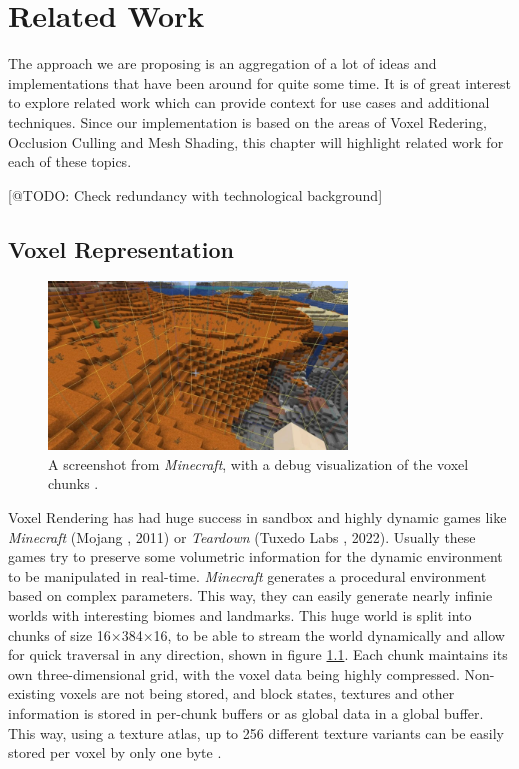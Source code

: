 \chapter{Related Work} \label{cpt-related-work}

The approach we are proposing is an aggregation of a lot of ideas and implementations that have been 
around for quite some time. It is of great interest to explore related work which can provide 
context for use cases and additional techniques. Since our implementation is based on the areas 
of Voxel Redering, Occlusion Culling and Mesh Shading, this chapter will highlight related work 
for each of these topics.

[@TODO: Check redundancy with technological background]

\section{Voxel Representation} \label{sec-voxel-representation}

\begin{figure}[h]
    \centering
    \includegraphics[width=300px]{images/graphics/minecraft-chunks.jpg}
    \caption{A screenshot from \emph{Minecraft}, with a debug visualization of the voxel chunks \cite{Palm2022}.}
    \label{fig:minecraft-chunks}
\end{figure}

\noindent
Voxel Rendering has had huge success in sandbox and highly dynamic games like \emph{Minecraft} (Mojang 
\cite{Mojang2024}, 2011) or \emph{Teardown} (Tuxedo Labs \cite{TuxedoLabs2022}, 2022). Usually these games try 
to preserve some volumetric information for the dynamic environment to be manipulated in real-time. \emph{Minecraft} 
generates a procedural environment based on complex parameters. This way, they can easily generate nearly infinie 
worlds with interesting biomes and landmarks. This huge world is split into chunks of size 16×384×16, to be able to 
stream the world dynamically and allow for quick traversal in any direction, shown in figure \ref{fig:minecraft-chunks}.
Each chunk maintains its own three-dimensional grid, with the voxel data being highly compressed. Non-existing voxels 
are not being stored, and block states, textures and other information is stored in per-chunk buffers or as global 
data in a global buffer. This way, using a texture atlas, up to 256 different texture variants can be easily stored 
per voxel by only one byte \cite{Bergensten2012, MinecraftFandom2021}. \\

